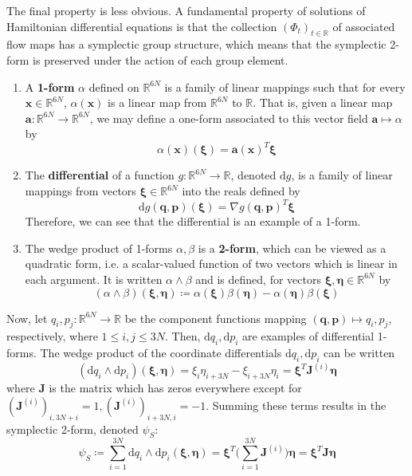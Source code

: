 \documentclass{article}
\begin{document}
      The final property is less obvious. A fundamental property of solutions of Hamiltonian differential equations is that the collection $(\Phi_t)_{t \in \mathbb{R}}$ of associated flow maps has a symplectic group structure, which means that the symplectic 2-form is preserved under the action of each group element. 
      \begin{enumerate}
          \item A \textbf{1-form} $\alpha$ defined on $\mathbb{R}^{6N}$ is a family of linear mappings such that for every $\mathbf{x} \in \mathbb{R}^{6N}$, $\alpha(\mathbf{x})$ is a linear map from $\mathbb{R}^{6N}$ to $\mathbb{R}$. That is, given a linear map $\mathbf{a}: \mathbb{R}^{6N} \longrightarrow \mathbb{R}^{6N}$, we may define a one-form associated to this vector field $\mathbf{a} \mapsto \alpha$ by 
          \[\alpha(\mathbf{x}) (\boldsymbol{\xi}) = \mathbf{a} (\mathbf{x})^T \boldsymbol{\xi}\] 
          \item The \textbf{differential} of a function $g: \mathbb{R}^{6N} \longrightarrow \mathbb{R}$, denoted $\mathrm{d}g$, is a family of linear mappings from vectors $\boldsymbol{\xi} \in \mathbb{R}^{6N}$ into the reals defined by 
          \[\mathrm{d}g (\mathbf{q}, \mathbf{p}) (\boldsymbol{\xi}) = \nabla g(\mathbf{q}, \mathbf{p})^T \boldsymbol{\xi}\]
          Therefore, we can see that the differential is an example of a 1-form. 
          \item The wedge product of 1-forms $\alpha, \beta$ is a \textbf{2-form}, which can be viewed as a quadratic form, i.e. a scalar-valued function of two vectors which is linear in each argument. It is written $\alpha \wedge \beta$ and is defined, for vectors $\boldsymbol{\xi}, \boldsymbol{\eta} \in \mathbb{R}^{6N}$ by 
          \[(\alpha \wedge \beta)(\boldsymbol{\xi}, \boldsymbol{\eta}) \coloneqq \alpha(\boldsymbol{\xi}) \beta(\boldsymbol{\eta}) - \alpha(\boldsymbol{\eta}) \beta(\boldsymbol{\xi})\]
      \end{enumerate}
      Now, let $q_i, p_j: \mathbb{R}^{6N} \longrightarrow \mathbb{R}$ be the component functions mapping $(\mathbf{q}, \mathbf{p}) \mapsto q_i, p_j$, respectively, where $1 \leq i, j \leq 3N$. Then, $\mathrm{d} q_i, \mathrm{d} p_i$ are examples of differential 1-forms. The wedge product of the coordinate differentials $\mathrm{d}q_i, \mathrm{d} p_i$ can be written
      \[(\mathrm{d}q_i \wedge \mathrm{d} p_i)(\boldsymbol{\xi}, \boldsymbol{\eta}) = \xi_i\eta_{i + 3N} - \xi_{i + 3N} \eta_i = \boldsymbol{\xi}^T \mathbf{J}^{(i)} \boldsymbol{\eta}\]
      where $\mathbf{J}$ is the matrix which has zeros everywhere except for $(\mathbf{J}^{(i)})_{i, 3N + i} = 1, (\mathbf{J}^{(i)})_{i + 3N, i} = -1$. Summing these terms results in the symplectic 2-form, denoted $\psi_S$: 
      \[\psi_S \coloneqq \sum_{i=1}^{3N} \mathrm{d}q_i \wedge \mathrm{d} p_i (\boldsymbol{\xi}, \boldsymbol{\eta}) = \boldsymbol{\xi}^T \bigg( \sum_{i=1}^{3N} \mathbf{J}^{(i)} \bigg) \boldsymbol{\eta} = \boldsymbol{\xi}^T \mathbf{J} \boldsymbol{\eta}\]
\end{document}

